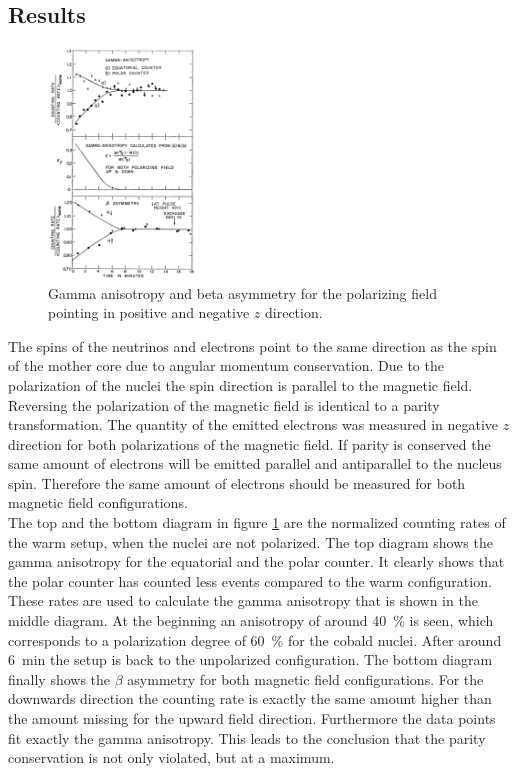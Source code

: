 \subsection{Results}
\begin{figure}
    \includegraphics[width=0.35\textwidth]{graphics/Wu_result.png}
    \caption{Gamma anisotropy and beta asymmetry for the polarizing field pointing in positive and negative $z$ direction. \cite{wu}}
		\label{fig:Wu_result}
  \end{figure}
  \FloatBarrier
The spins of the neutrinos and electrons point to the same direction as the spin of the mother core due to angular momentum conservation.
Due to the polarization of the nuclei the spin direction is parallel to the magnetic field.
Reversing the polarization of the magnetic field is identical to a parity transformation. The quantity of the emitted electrons was measured in negative $z$ direction for both polarizations of the magnetic field. If parity is conserved the same amount of electrons will be emitted parallel and antiparallel to the nucleus spin. Therefore the same amount of electrons should be measured for both magnetic field configurations.\\
The top and the bottom diagram in figure \ref{fig:Wu_result} are the normalized counting rates of the warm setup, when the nuclei are not polarized. The top diagram shows the gamma anisotropy for the equatorial and the polar counter. It clearly shows that the polar counter has counted less events compared to the warm configuration. These rates are used to calculate the gamma anisotropy that is shown in the middle diagram. At the beginning an anisotropy of around \SI{40}{\percent} is seen, which corresponds to a polarization  degree of \SI{60}{\percent} for the cobald nuclei. After around \SI{6}{\minute} the setup is back to the unpolarized configuration. The bottom diagram finally shows the $\beta$ asymmetry for both magnetic field configurations. For the downwards direction the counting rate is exactly the same amount higher than the amount missing for the upward field direction. Furthermore the data points fit exactly the gamma anisotropy. This leads to the conclusion that the parity conservation is not only violated, but at a maximum.\\
